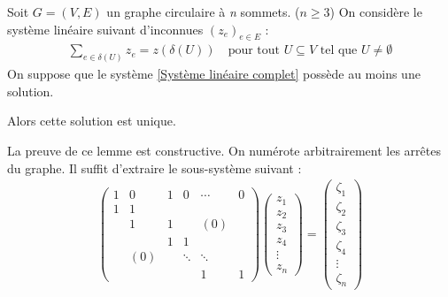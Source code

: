 \documentclass[twoside,11pt,openany,a4paper]{rapport}
\begin{document}
\begin{lem}\label{Changement de base}
Soit $G=(V,E)$ un graphe circulaire à \emph{n} sommets. ($n \ge 3$)
On considère le système linéaire suivant d'inconnues $(z_e)_{e \in E}$ :
\begin{gather}\label{Système linéaire complet}
  \sum_{e \in \delta(U)}z_e = z(\delta(U)) \quad \mbox{pour tout } U \subseteq V \mbox{ tel que } U \ne \emptyset
\end{gather}
On suppose que le système \ref{Système linéaire complet} possède au moins une solution.

Alors cette solution est unique.
\end{lem}

La preuve de ce lemme est constructive. On numérote arbitrairement les arrêtes du graphe. Il suffit d'extraire le sous-système suivant :
\begin{gather}\label{Système linéaire extrait}
  \left(
  \begin{array}{cccccc}
    1 & 0   & 1 & 0      & \cdots & 0 \\
    1 & 1   &   &        &        &   \\
      & 1   & 1 &        & (0)    &   \\
      &     & 1 & 1      &        &   \\
      & (0) &   & \ddots & \ddots &   \\
      &     &   &        & 1      & 1
  \end{array} \right)
  \left(
  \begin{array}{c}
    z_1 \\
    z_2 \\
    z_3 \\
    z_4 \\
    \vdots \\
    z_n
  \end{array} \right)
  =
  \left(
  \begin{array}{c}
    \zeta_1 \\
    \zeta_2 \\
    \zeta_3 \\
    \zeta_4 \\
    \vdots  \\
    \zeta_n
  \end{array} \right)
\end{gather}
\end{document}
